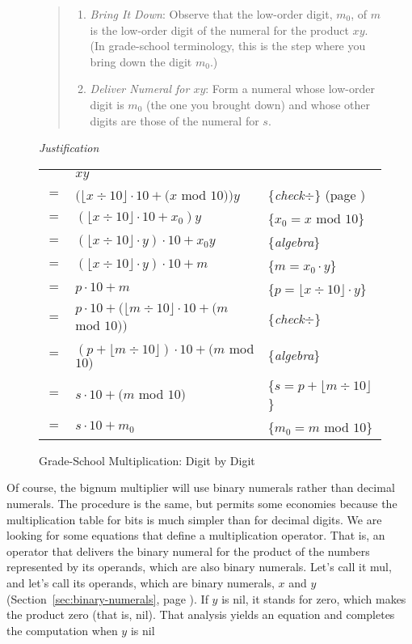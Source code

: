 \begin{figure}
\begin{quote}
\begin{enumerate}
\item \emph{Bring It Down}:
Observe that the low-order digit, $m_0$, of $m$
is the low-order digit of the numeral for the product $x y$.
(In grade-school terminology,
this is the step where you bring down the digit $m_0$.)

\item \emph{Deliver Numeral for $x y$}:
Form a numeral whose low-order digit is $m_0$ (the one you brought down)
and whose other digits are those of the numeral for $s$.
\end{enumerate}
\end{quote}

\emph{Justification}
\begin{center}
\begin{tabular}{cll}
    & $x y$ & \\
$=$ & $(\lfloor x \div 10\rfloor \cdot 10 + (x$ mod $10)) y$  & \{\emph{check}$\div$\} (page \pageref{third-grade-division})\\
$=$ & $(\lfloor x \div 10\rfloor \cdot 10 + x_0) y$           & \{$x_0=x$ mod $10$\}\\
$=$ & $(\lfloor x \div 10\rfloor \cdot y) \cdot 10 + x_0 y$   & \{\emph{algebra}\} \\
$=$ & $(\lfloor x \div 10\rfloor \cdot y) \cdot 10 + m$       & \{$m=x_0\cdot y$\} \\
$=$ & $p \cdot 10 + m$                                        & \{$p=\lfloor x \div 10\rfloor \cdot y$\} \\
$=$ & $p \cdot 10 + (\lfloor m \div 10 \rfloor \cdot 10 + (m$ mod $10))$& \{\emph{check}$\div$\} \\
$=$ & $(p + \lfloor m \div 10 \rfloor) \cdot 10 + (m$ mod $10)$       & \{\emph{algebra}\} \\
$=$ & $s \cdot 10 + (m$ mod $10)$                             & \{$s=p + \lfloor m \div 10 \rfloor$\} \\
$=$ & $s \cdot 10 + m_0$                                      & \{$m_0=m$ mod $10$\} \\
\end{tabular}
\end{center}
\label{multiplication!grade school}
\caption{Grade-School Multiplication: Digit by Digit}
\label{fig:grade-school-mult}
\end{figure}

Of course, the bignum multiplier
will use binary numerals rather than decimal numerals.
The procedure is the same, but permits some economies
because the multiplication table for bits is much simpler
than for decimal digits.
We are looking for some equations that define a multiplication operator.
That is, an operator that delivers the binary numeral for the product of the numbers
represented by its operands, which are also binary numerals.
Let's call it \textsf{mul}, and let's call its operands, which are binary numerals,
$x$ and $y$ (Section~\ref{sec:binary-numerals}, page \pageref{sec:binary-numerals}).
If $y$ is nil, it stands for zero,
which makes the product zero (that is, \textsf{nil}).
That analysis yields an equation and completes
the computation when $y$ is \textsf{nil}

